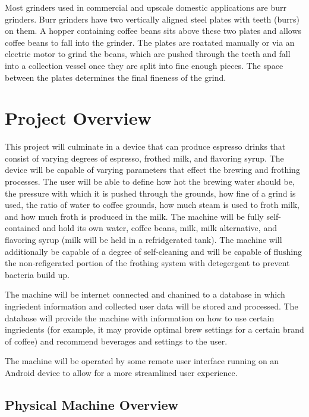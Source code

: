 \documentclass[conference]{IEEEtran}
\begin{document}
Most grinders used in commercial and upscale domestic applications are burr
grinders. Burr grinders have two vertically aligned steel plates with teeth
(burrs) on them. A hopper containing coffee beans sits above these two plates
and allows coffee beans to fall into the grinder.
The plates are roatated manually or via an electric motor to grind the beans,
which are pushed through the teeth and fall into a collection vessel once they
are split into fine enough pieces.
The space between the plates determines the final fineness of the grind.


\section{Project Overview}

This project will culminate in a device that can produce espresso drinks that
consist of varying degrees of espresso, frothed milk, and flavoring syrup. The
device will be capable of varying parameters that effect the brewing and
frothing processes. The user will be able to define how hot the brewing water
should be, the pressure with which it is pushed through the grounds, how fine of
a grind is used, the ratio of water to coffee grounds, how much steam is used to
froth milk, and how much froth is produced in the milk. The machine will be
fully self-contained and hold its own water, coffee beans, milk, milk
alternative, and flavoring syrup (milk will be held in a refridgerated tank).
The machine will additionally be capable of a degree of self-cleaning and will
be capable of flushing the non-refigerated portion of the frothing system with
detegergent to prevent bacteria build up.

The machine will be internet connected and chanined to a database in which
ingriedent information and collected user data will be stored and processed. The
database will provide the machine with information on how to use certain
ingriedents (for example, it may provide optimal brew settings for a certain
brand of coffee) and recommend beverages and settings to the user.

The machine will be operated by some remote user interface running on an Android
device to allow for a more  streamlined user experience.

\subsection{Physical Machine Overview}
\end{document}
